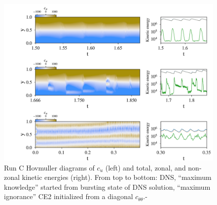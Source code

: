 \documentclass{jfm}
\newcommand{\cu}{c_u}
\newcommand{\ctt}{c_{\theta \theta}}
\begin{document}
\begin{figure}
  \centering
  \includegraphics[width=\textwidth]{../../figs/run_C_fig.pdf}
  \caption{ Run C Hovmuller diagrams of $\cu$ (left) and total, zonal, and non-zonal kinetic energies (right). From top to bottom:  DNS, ``maximum knowledge'' started from bursting state of DNS solution, ``maximum ignorance'' CE2 initialized from a diagonal $\ctt$.- }
  \label{fig:run_C}
\end{figure}
\end{document}
